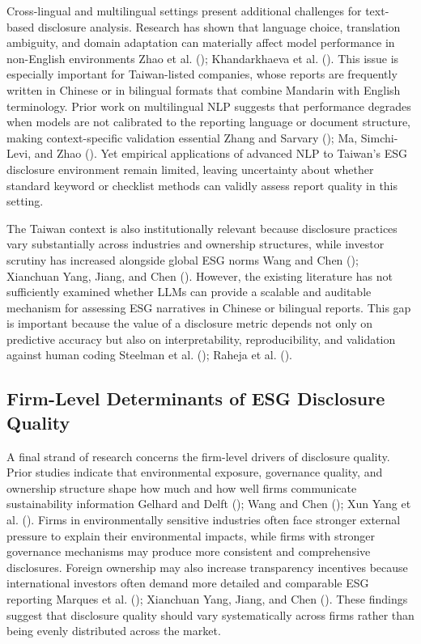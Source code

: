 \documentclass[
  12pt,
]{article}
\begin{document}
Cross-lingual and multilingual settings present additional challenges
for text-based disclosure analysis. Research has shown that language
choice, translation ambiguity, and domain adaptation can materially
affect model performance in non-English environments Zhao et al.
(); Khandarkhaeva et al.
(). This issue is especially
important for Taiwan-listed companies, whose reports are frequently
written in Chinese or in bilingual formats that combine Mandarin with
English terminology. Prior work on multilingual NLP suggests that
performance degrades when models are not calibrated to the reporting
language or document structure, making context-specific validation
essential Zhang and Sarvary (); Ma,
Simchi-Levi, and Zhao (). Yet empirical
applications of advanced NLP to Taiwan's ESG disclosure environment
remain limited, leaving uncertainty about whether standard keyword or
checklist methods can validly assess report quality in this setting.

The Taiwan context is also institutionally relevant because disclosure
practices vary substantially across industries and ownership structures,
while investor scrutiny has increased alongside global ESG norms Wang
and Chen (); Xianchuan Yang, Jiang, and
Chen (). However, the existing literature
has not sufficiently examined whether LLMs can provide a scalable and
auditable mechanism for assessing ESG narratives in Chinese or bilingual
reports. This gap is important because the value of a disclosure metric
depends not only on predictive accuracy but also on interpretability,
reproducibility, and validation against human coding Steelman et al.
(); Raheja et al.
().

\subsection{Firm-Level Determinants of ESG Disclosure
Quality}\label{firm-level-determinants-of-esg-disclosure-quality}

A final strand of research concerns the firm-level drivers of disclosure
quality. Prior studies indicate that environmental exposure, governance
quality, and ownership structure shape how much and how well firms
communicate sustainability information Gelhard and Delft
(); Wang and Chen
(); Xun Yang et al.
(). Firms in environmentally sensitive
industries often face stronger external pressure to explain their
environmental impacts, while firms with stronger governance mechanisms
may produce more consistent and comprehensive disclosures. Foreign
ownership may also increase transparency incentives because
international investors often demand more detailed and comparable ESG
reporting Marques et al. (); Xianchuan
Yang, Jiang, and Chen (). These findings
suggest that disclosure quality should vary systematically across firms
rather than being evenly distributed across the market.
\end{document}
